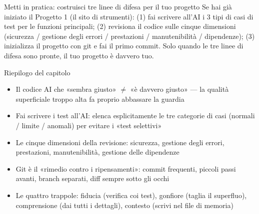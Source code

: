 \begin{tcbpractice}{Metti in pratica: costruisci tre linee di difesa per il tuo progetto}
Se hai già iniziato il Progetto 1 (il sito di strumenti): (1) fai scrivere all'AI i 3 tipi di casi di test per le funzioni principali; (2) revisiona il codice sulle cinque dimensioni (sicurezza / gestione degli errori / prestazioni / manutenibilità / dipendenze); (3) inizializza il progetto con git e fai il primo commit. Solo quando le tre linee di difesa sono pronte, il tuo progetto è davvero tuo.

\end{tcbpractice}

\begin{tcbsummary}{Riepilogo del capitolo}
\begin{itemize}
  \item Il codice AI che «sembra giusto» $\neq$ «è davvero giusto» — la qualità superficiale troppo alta fa proprio abbassare la guardia
  \item Fai scrivere i test all'AI: elenca esplicitamente le tre categorie di casi (normali / limite / anomali) per evitare i «test selettivi»
  \item Le cinque dimensioni della revisione: sicurezza, gestione degli errori, prestazioni, manutenibilità, gestione delle dipendenze
  \item Git è il «rimedio contro i ripensamenti»: commit frequenti, piccoli passi avanti, branch separati, diff sempre sotto gli occhi
  \item Le quattro trappole: fiducia (verifica coi test), gonfiore (taglia il superfluo), comprensione (dai tutti i dettagli), contesto (scrivi nel file di memoria)
\end{itemize}

\end{tcbsummary}
